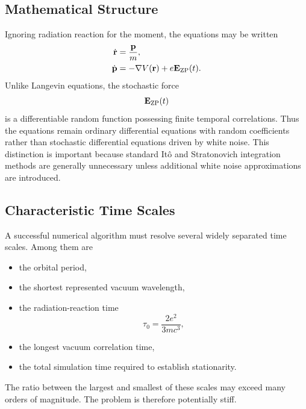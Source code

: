 \subsection{Mathematical Structure}
Ignoring radiation reaction for the moment, the equations may be written
\begin{align}
\dot{\mathbf r}&=\frac{\mathbf p}{m},\\
\dot{\mathbf p}&=-\nabla V(\mathbf r)+e\mathbf E_{\rm ZP}(t).
\end{align}
Unlike Langevin equations,
the stochastic force
\[\mathbf E_{\rm ZP}(t)\]
is a differentiable random function possessing finite temporal
correlations.
Thus the equations remain ordinary differential equations with random
coefficients rather than stochastic differential equations driven by
white noise.
This distinction is important because standard Itô and Stratonovich
integration methods are generally unnecessary unless additional white
noise approximations are introduced.
\subsection{Characteristic Time Scales}
A successful numerical algorithm must resolve several widely separated
time scales.
Among them are
\begin{itemize}
\item
the orbital period,
\item
the shortest represented vacuum wavelength,
\item
the radiation-reaction time
\[\tau_0=\frac{2e^2}{3mc^3},\]
\item
the longest vacuum correlation time,
\item
the total simulation time required to establish stationarity.
\end{itemize}
The ratio between the largest and smallest of these scales may exceed
many orders of magnitude.
The problem is therefore potentially stiff.
